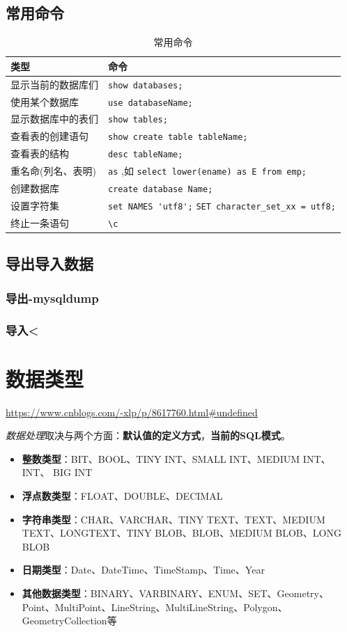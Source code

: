 \documentclass[UTF8,a4paper,12pt]{ctexbook}
\begin{document}
	\section{常用命令}
		\begin{table}[H]
			\centering
			\caption{常用命令}
			\begin{tabular}{p{4cm}<{\centering}|p{11cm}<{\centering}}
				\hline
					类型  & 命令 \\
				\hline
					显示当前的数据库们  & \verb|show databases;| \\
					使用某个数据库		 & \verb|use databaseName;| \\
					显示数据库中的表们  & \verb|show tables;|	\\
					查看表的创建语句	& \verb|show create table tableName;|	\\
					查看表的结构	& \verb|desc tableName;|	\\
					重名命(列名、表明)	& \verb|as| ,如 \verb|select lower(ename) as E from emp;|	\\
					创建数据库	& \verb|create database Name;|	\\
					设置字符集	& \verb|set NAMES 'utf8';| \verb|SET character_set_xx = utf8;|	\\
					终止一条语句	& \verb|\c|	\\
				\hline
			\end{tabular}
		\end{table}

	
	\section{导出导入数据}
		\subsection{导出-mysqldump}
	
	
		\subsection{导入<}
		
\chapter{数据类型}
	\url{https://www.cnblogs.com/-xlp/p/8617760.html#undefined}
	
	\textit{数据处理}取决与两个方面：\textbf{默认值的定义方式}，\textbf{当前的SQL模式}。
	
	\begin{itemize}
		\item \textbf{整数类型}：BIT、BOOL、TINY INT、SMALL INT、MEDIUM INT、 INT、 BIG INT
		\item \textbf{浮点数类型}：FLOAT、DOUBLE、DECIMAL
		\item \textbf{字符串类型}：CHAR、VARCHAR、TINY TEXT、TEXT、MEDIUM TEXT、LONGTEXT、TINY BLOB、BLOB、MEDIUM BLOB、LONG BLOB
		\item \textbf{日期类型}：Date、DateTime、TimeStamp、Time、Year
		\item \textbf{其他数据类型}：BINARY、VARBINARY、ENUM、SET、Geometry、Point、MultiPoint、LineString、MultiLineString、Polygon、GeometryCollection等
	\end{itemize}
\end{document}
